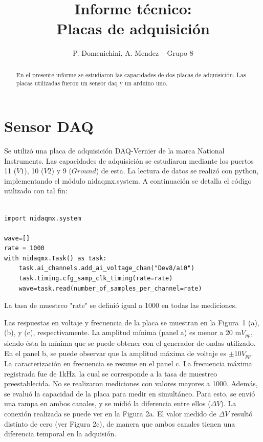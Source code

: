 \documentclass[a4paper,10pt]{article}
\title{Informe técnico: \\
Placas de adquisición}
\author{P. Domenichini, A. Mendez -- Grupo 8}
\begin{document}
\maketitle

\begin{abstract}
    En el presente informe se estudiaron las capacidades de dos placas de adquisición. Las placas utilizadas fueron un sensor  {\sc daq} y un arduino  {\sc uno}. 
\end{abstract}

\section{Sensor DAQ}

Se utilizó una placa de adquisición DAQ-Vernier de la marca National Instruments. Las capacidades de adquisición se estudiaron mediante los puertos 11 ($V1$), 10 ($V2$) y 9 ($Ground$) de esta. La lectura de datos se realizó con {\sc python}, implementando el módulo {\sc nidaqmx.system}. A continuación se detalla el código utilizado con tal fin:
\lstset{language=Python}
\begin{lstlisting}[frame=single]  % Start your code-block

import nidaqmx.system

wave=[]
rate = 1000
with nidaqmx.Task() as task:
    task.ai_channels.add_ai_voltage_chan("Dev8/ai0")
    task.timing.cfg_samp_clk_timing(rate=rate)
    wave=task.read(number_of_samples_per_channel=rate)
\end{lstlisting}
La tasa de muestreo "rate" se definió igual a 1000 en todas las mediciones. 

Las respuestas en voltaje y frecuencia de la placa se muestran en la Figura~1 (a), (b), y (c), respectivamente. La amplitud mínima (panel a) es menor a 20 m$V_{pp}$, siendo ésta la mínima que se puede obtener con el generador de ondas utilizado. En el panel b, se puede observar que la amplitud máxima de voltaje es $\pm 10 V_{pp}$.  La caracterización en frecuencia se resume en el panel c. La frecuencia máxima registrada fue de 1kHz, la cual se corresponde a la tasa de muestreo preestablecida. No se realizaron mediciones con valores mayores a 1000. 
Además, se evaluó la capacidad de la placa para medir en simultáneo. Para esto, se envió una rampa en ambos canales, y se midió la  diferencia entre ellos ($\Delta V$). La conexión realizada se puede ver en la Figura 2a. El valor medido de $\Delta V$ resultó distinto de cero (ver Figura 2c), de manera que ambos canales tienen una diferencia temporal en la adquisión. 
\end{document}

